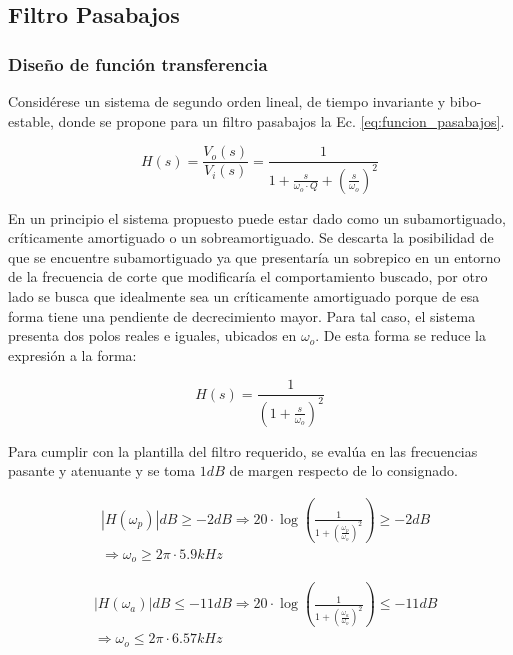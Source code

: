 \subsection{Filtro Pasabajos}

\subsubsection{Dise\~no de funci\'on transferencia}
Consid\'erese un sistema de segundo orden lineal, de tiempo invariante y bibo-estable, donde se propone para un filtro pasabajos la Ec. \ref{eq:funcion_pasabajos}.

\begin{equation}
    H(s) = \frac{V_o(s)}{V_i(s)} = \frac{1}{1 + \frac{s}{\omega_o \cdot Q} + \left( \frac{s}{\omega_o}\right)^{2}}
    \label{eq:funcion_pasabajos}
\end{equation}

En un principio el sistema propuesto
puede estar dado como un subamortiguado, cr\'iticamente amortiguado o un sobreamortiguado. Se descarta la posibilidad de que se encuentre subamortiguado ya que presentar\'ia un sobrepico en un entorno de la frecuencia de corte
que modificar\'ia el comportamiento buscado, por otro lado se busca que idealmente sea un cr\'iticamente amortiguado porque de esa forma tiene una pendiente de decrecimiento mayor. Para tal caso, el sistema presenta dos polos reales e iguales, ubicados en $\omega_o$. De esta forma se reduce la expresi\'on a la forma:

\begin{equation}
    H(s) = \frac{1}{\left(1 + \frac{s}{\omega_o}\right)^{2}}
    \label{eq:funcion_pasabajos_ideal}
\end{equation}

Para cumplir con la plantilla del filtro requerido, se eval\'ua en las frecuencias pasante y atenuante y se toma $1dB$ de margen respecto de lo consignado.

\begin{eqnarray*}
    & |H(\omega_p)|dB \geq -2dB \Rightarrow 20 \cdot \log{\left(\frac{1}{1 + \left(\frac{\omega_p}{\omega_o}\right)^{2}}\right)} \geq -2dB\\
    & \Rightarrow \omega_o \geq 2\pi \cdot 5.9kHz
\end{eqnarray*}

\begin{eqnarray*}
    & |H(\omega_a)|dB \leq -11dB \Rightarrow 20 \cdot \log{\left(\frac{1}{1 + \left(\frac{\omega_a}{\omega_o}\right)^{2}}\right)} \leq -11dB \\
    & \Rightarrow \omega_o \leq 2 \pi \cdot 6.57kHz
\end{eqnarray*}

